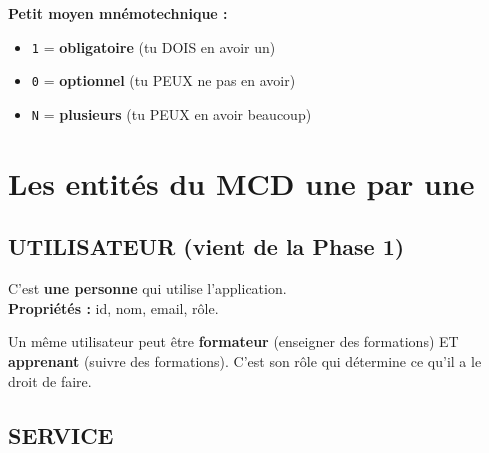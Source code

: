 \documentclass[12pt,a4paper]{article}
\begin{document}
\vspace{12pt}

\begin{infobox}
    \textbf{Petit moyen mnémotechnique :}
    \begin{itemize}
        \item \texttt{1} = \textbf{obligatoire} (tu DOIS en avoir un)
        \item \texttt{0} = \textbf{optionnel} (tu PEUX ne pas en avoir)
        \item \texttt{N} = \textbf{plusieurs} (tu PEUX en avoir beaucoup)
    \end{itemize}
\end{infobox}

\section{Les entités du MCD une par une}

\subsection{UTILISATEUR (vient de la Phase 1)}

\begin{minipage}[t]{0.65\textwidth}
C'est \textbf{une personne} qui utilise l'application. \\
\textbf{Propriétés :} id, nom, email, rôle.

\vspace{4pt}
\end{minipage}

\vspace{12pt}

Un même utilisateur peut être \textbf{formateur} (enseigner des formations) ET \textbf{apprenant} (suivre des formations). C'est son rôle qui détermine ce qu'il a le droit de faire.

\subsection{SERVICE}
\end{document}
